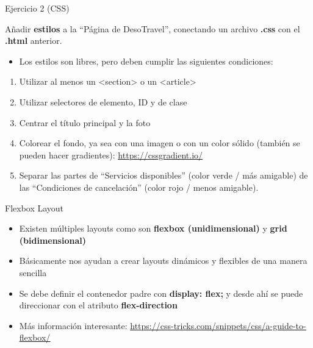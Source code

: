 \documentclass[aspectratio=43,10pt,t]{beamer}
\begin{document}
{\begin{frame}{Ejercicio 2 (CSS)}\relax
\begingroup
{}
{\fontsize{11.5}{13.7}\selectfont Añadir \textbf{estilos} a la “Página de DesoTravel”, conectando un archivo \textbf{.css} con el \textbf{.html} anterior.\par}
\begin{itemize}
  \item\relax Los estilos son libres, pero deben cumplir las siguientes condiciones:
\end{itemize}
\begin{enumerate}
  \item\relax Utilizar al menos un <section> o un <article>
  \item\relax Utilizar selectores de elemento, ID y de clase
  \item\relax Centrar el título principal y la foto
  \item\relax Colorear el fondo, ya sea con una imagen o con un color sólido (también se pueden hacer gradientes): \href{https://cssgradient.io/}{\uline{https:/\allowbreak{}/\allowbreak{}cssgradient.io/\allowbreak{}}} 
  \item\relax Separar las partes de “Servicios disponibles” (color verde / más amigable) de las “Condiciones de cancelación” (color rojo / menos amigable).
\end{enumerate}
\endgroup
\end{frame}
}

\begin{frame}{Flexbox Layout}\relax
\begingroup
{}
\begin{itemize}
  \item\relax Existen múltiples layouts como son \textbf{flexbox (unidimensional)} y \textbf{grid (bidimensional)}
  \item\relax Básicamente nos ayudan a crear layouts dinámicos y flexibles de una manera sencilla
  \item\relax Se debe definir el contenedor padre con \textbf{display: flex;} y desde ahí se puede direccionar con el atributo \textbf{flex-direction}
  \item\relax Más información interesante: \href{https://css-tricks.com/snippets/css/a-guide-to-flexbox/}{\uline{https:/\allowbreak{}/\allowbreak{}css-tricks.com/\allowbreak{}snippets/\allowbreak{}css/\allowbreak{}a-guide-to-flexbox/\allowbreak{}}} 
\end{itemize}
\endgroup
{}
\end{frame}
\end{document}
